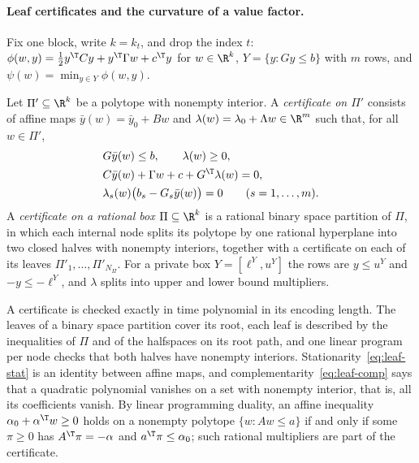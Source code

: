 \paragraph{Leaf certificates and the curvature of a value factor.}
Fix one block, write $k=k_t$, and drop the index $t$:
$\phi(w,y)=\frac12y^{\T}Cy+y^{\T}\Gamma w+c^{\T}y$ for $w\in\R^k$,
$Y=\{y:Gy\le b\}$ with $m$ rows, and $\psi(w)=\min_{y\in Y}\phi(w,y)$.

\begin{definition}\label{def:leaf}
Let $\Pi'\subseteq\R^k$ be a polytope with nonempty interior. A
\emph{certificate on $\Pi'$} consists of affine maps
$\bar y(w)=\bar y_0+Bw$ and $\lambda(w)=\lambda_0+\Lambda w\in\R^m$ such
that, for all $w\in\Pi'$,
\begin{align}
&G\bar y(w)\le b,\qquad \lambda(w)\ge0,\label{eq:leaf-feas}\\
&C\bar y(w)+\Gamma w+c+G^{\T}\lambda(w)=0,\label{eq:leaf-stat}\\
&\lambda_s(w)\bigl(b_s-G_s\bar y(w)\bigr)=0\qquad(s=1,\ldots,m).\label{eq:leaf-comp}
\end{align}
A \emph{certificate on a rational box $\Pi\subseteq\R^k$} is a rational
binary space partition of $\Pi$, in which each internal node splits its
polytope by one rational hyperplane into two closed halves with nonempty
interiors, together with a certificate on each of its leaves
$\Pi'_1,\ldots,\Pi'_{N_\Pi}$. For a private box $Y=[\ell^Y,u^Y]$ the rows are
$y\le u^Y$ and $-y\le-\ell^Y$, and $\lambda$ splits into upper and lower
bound multipliers.
\end{definition}

A certificate is checked exactly in time polynomial in its encoding length.
The leaves of a binary space partition cover its root, each leaf is
described by the inequalities of $\Pi$ and of the halfspaces on its root
path, and one linear program per node checks that both halves have
nonempty interiors. Stationarity~\eqref{eq:leaf-stat} is an identity between
affine maps, and complementarity~\eqref{eq:leaf-comp} says that a quadratic
polynomial vanishes on a set with nonempty interior, that is, all its
coefficients vanish. By linear programming duality, an affine inequality
$\alpha_0+\alpha^{\T}w\ge0$ holds on a nonempty polytope $\{w:Aw\le a\}$ if
and only if some $\pi\ge0$ has $A^{\T}\pi=-\alpha$ and
$a^{\T}\pi\le\alpha_0$; such rational multipliers are part of the
certificate.

